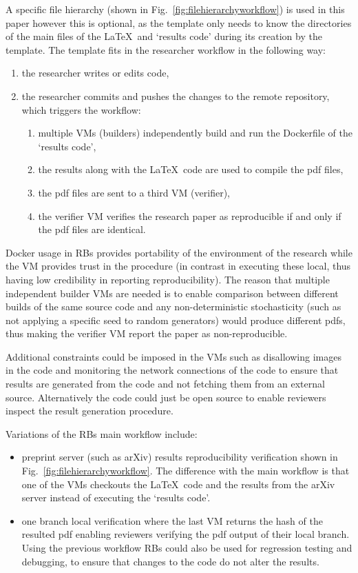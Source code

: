 \documentclass[journal]{IEEEtran}
\begin{document}
A specific file hierarchy (shown in Fig.~\ref{fig:filehierarchyworkflow}) is used in this paper however this is optional, as the template only needs to know the directories of the main files of the \LaTeX\ and `results code' during its creation by the template.
The template fits in the researcher workflow in the following way:
\begin{enumerate}
	\item the researcher writes or edits code,
	\item the researcher commits and pushes the changes to the remote repository, which triggers the workflow:
		\begin{enumerate}
			\item multiple VMs (builders) independently build and run the Dockerfile of the `results code',
			\item the results along with the \LaTeX\ code are used to compile the pdf files,
			\item the pdf files are sent to a third VM (verifier),
			\item the verifier VM verifies the research paper as reproducible if and only if the pdf files are identical.
		\end{enumerate}
\end{enumerate}

Docker usage in RBs provides portability of the environment of the research while the VM provides trust in the procedure (in contrast in executing these local, thus having low credibility in reporting reproducibility).
The reason that multiple independent builder VMs are needed is to enable comparison between different builds of the same source code and any non-deterministic stochasticity (such as not applying a specific seed to random generators) would produce different pdfs, thus making the verifier VM report the paper as non-reproducible.

Additional constraints could be imposed in the VMs such as disallowing images in the code and monitoring the network connections of the code to ensure that results are generated from the code and not fetching them from an external source.
Alternatively the code could just be open source to enable reviewers inspect the result generation procedure.

Variations of the RBs main workflow include:
\begin{itemize}
	\item preprint server (such as arXiv) results reproducibility verification shown in Fig.~\ref{fig:filehierarchyworkflow}.
		The difference with the main workflow is that one of the VMs checkouts the \LaTeX\ code and the results from the arXiv server instead of executing the `results code'.
	\item one branch local verification where the last VM returns the hash of the resulted pdf enabling reviewers verifying the pdf output of their local branch.
		Using the previous workflow RBs could also be used for regression testing and debugging, to ensure that changes to the code do not alter the results.
\end{itemize}
\end{document}
